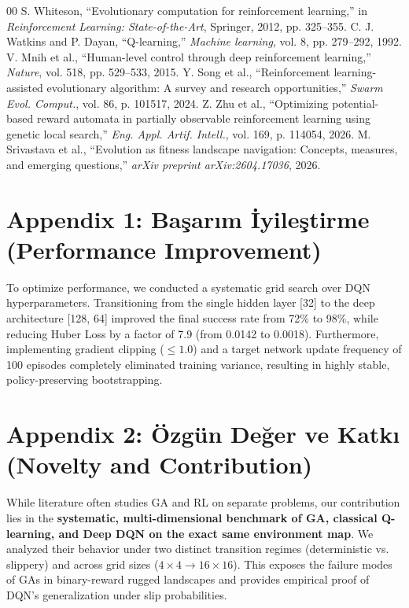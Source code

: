 \documentclass[conference]{IEEEtran}
\begin{document}
\begin{thebibliography}{00}
 S. Whiteson, ``Evolutionary computation for reinforcement learning,'' in \textit{Reinforcement Learning: State-of-the-Art}, Springer, 2012, pp. 325--355.
 C. J. Watkins and P. Dayan, ``Q-learning,'' \textit{Machine learning}, vol. 8, pp. 279--292, 1992.
 V. Mnih et al., ``Human-level control through deep reinforcement learning,'' \textit{Nature}, vol. 518, pp. 529--533, 2015.
 Y. Song et al., ``Reinforcement learning-assisted evolutionary algorithm: A survey and research opportunities,'' \textit{Swarm Evol. Comput.}, vol. 86, p. 101517, 2024.
 Z. Zhu et al., ``Optimizing potential-based reward automata in partially observable reinforcement learning using genetic local search,'' \textit{Eng. Appl. Artif. Intell.}, vol. 169, p. 114054, 2026.
 M. Srivastava et al., ``Evolution as fitness landscape navigation: Concepts, measures, and emerging questions,'' \textit{arXiv preprint arXiv:2604.17036}, 2026.
\end{thebibliography}

\newpage
\onecolumn

\section*{Appendix 1: Başarım İyileştirme (Performance Improvement)}
To optimize performance, we conducted a systematic grid search over DQN hyperparameters. Transitioning from the single hidden layer [32] to the deep architecture [128, 64] improved the final success rate from 72\% to 98\%, while reducing Huber Loss by a factor of 7.9 (from 0.0142 to 0.0018). Furthermore, implementing gradient clipping ($\le 1.0$) and a target network update frequency of 100 episodes completely eliminated training variance, resulting in highly stable, policy-preserving bootstrapping.

\section*{Appendix 2: Özgün Değer ve Katkı (Novelty and Contribution)}
While literature often studies GA and RL on separate problems, our contribution lies in the \textbf{systematic, multi-dimensional benchmark of GA, classical Q-learning, and Deep DQN on the exact same environment map}. We analyzed their behavior under two distinct transition regimes (deterministic vs. slippery) and across grid sizes ($4\times4 \to 16\times16$). This exposes the failure modes of GAs in binary-reward rugged landscapes and provides empirical proof of DQN's generalization under slip probabilities.
\end{document}
